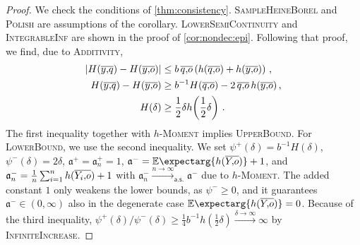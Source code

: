 \documentclass{scrartcl}
\newcommand{\Ex}{\E\expectarg}
\newcommand*{\ms}[1]{\mathsf{#1}}
\newcommand*{\mf}[1]{\mathfrak{#1}}
\newcommand{\equationFullstop}{\, .}
\newcommand{\eqfs}{\equationFullstop}
\newcommand{\equationComma}{\, ,}
\newcommand{\eqcm}{\equationComma}
\theoremstyle{plain}\newtheorem{theorem}{Theorem}[section]
\theoremstyle{definition}
\theoremstyle{remark}
\begin{document}
\begin{proof}
	We check the conditions of \autoref{thm:consistency}. \textsc{SampleHeineBorel} and \textsc{Polish} are assumptions of the corollary. \textsc{LowerSemiContinuity} and \textsc{IntegrableInf} are shown in the proof of \autoref{cor:nondec:epi}.
	Following that proof, we find, due to \textsc{Additivity},
	\begin{align*}
		\abs{H(\ol yq) - H(\ol yo)} &\leq b\, \ol qo \br{h(\ol qo) + h(\ol yo)}\eqcm
		\\
		H(\ol yq) - H(\ol yo) &\geq 	b^{-1} H( \ol qo) - 2 \,\ol qo\, h( \ol yo)\eqcm\\
		H(\delta)  &\geq \frac12 \delta h\brOf{\frac12 \delta}
		\eqfs
	\end{align*}
	The first inequality together with \textsc{$h$-Moment} implies \textsc{UpperBound}.
	For \textsc{LowerBound}, we use the second inequality. We set $\psi^+(\delta) = 	b^{-1} H(\delta)$, $\psi^-(\delta) = 2 \delta$, $\mf a^+=\mf a_n^+ = 1$, $\mf a^{-} = \Ex{h(\ol Yo)} + 1$, and $\mf a^-_n = \frac1n \sum_{i=1}^n h(\ol {Y_i}o) + 1$ with $\mf a^-_n\xrightarrow{n\to\infty}_{\ms{a.s.}}\mf a^-$ due to \textsc{$h$-Moment}. The added constant $1$ only weakens the lower bounds, as $\psi^-\geq0$, and it guarantees $\mf a^-\in(0,\infty)$ also in the degenerate case $\Ex{h(\ol Yo)} = 0$. Because of the third inequality, $\psi^+(\delta)/\psi^-(\delta) \geq \frac14 b^{-1} h(\frac12 \delta) \xrightarrow{\delta\to\infty} \infty$ by \textsc{InfiniteIncrease}.
\end{proof}
\end{document}
